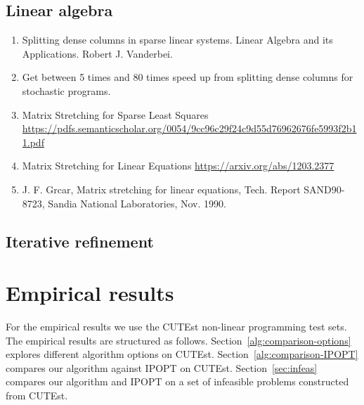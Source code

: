 \documentclass{article}
\begin{document}

%
\subsection{Linear algebra}


\begin{enumerate}
\item Splitting dense columns in sparse linear systems. Linear Algebra and its Applications. Robert J. Vanderbei. \cite{vanderbei1991splitting}
\item \cite{lustig1991formulating} Get between 5 times and 80 times speed up from splitting dense columns for stochastic programs.
\item Matrix Stretching for Sparse Least Squares \url{https://pdfs.semanticscholar.org/0054/9cc96c29f24c9d55d76962676fe5993f2b11.pdf}
\item Matrix Stretching for Linear Equations \url{https://arxiv.org/abs/1203.2377}
\item J. F. Grcar, Matrix stretching for linear equations, Tech. Report SAND90-8723, Sandia
National Laboratories, Nov. 1990.
\end{enumerate}

\subsection{Iterative refinement}

\section{Empirical results}\label{sec:empirical-results}

For the empirical results we use the CUTEst non-linear programming test sets. The empirical results are structured as follows. Section~\ref{alg:comparison-options} explores different algorithm options on CUTEst.  Section~\ref{alg:comparison-IPOPT} compares our algorithm against IPOPT on CUTEst. Section~\ref{sec:infeas} compares our algorithm and IPOPT on a set of infeasible problems constructed from CUTEst. %
\end{document}
